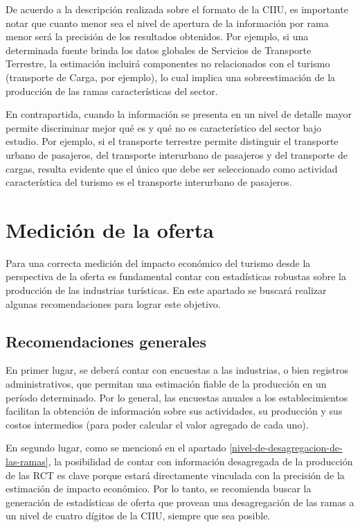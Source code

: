 \documentclass[
  openany]{book}
\begin{document}
De acuerdo a la descripción realizada sobre el formato de la CIIU, es importante notar que cuanto menor sea el nivel de apertura de la información por rama menor será la precisión de los resultados obtenidos. Por ejemplo, si una determinada fuente brinda los datos globales de Servicios de Transporte Terrestre, la estimación incluirá componentes no relacionados con el turismo (transporte de Carga, por ejemplo), lo cual implica una sobreestimación de la producción de las ramas características del sector.

En contrapartida, cuando la información se presenta en un nivel de detalle mayor permite discriminar mejor qué es y qué no es característico del sector bajo estudio. Por ejemplo, si el transporte terrestre permite distinguir el transporte urbano de pasajeros, del transporte interurbano de pasajeros y del transporte de cargas, resulta evidente que el único que debe ser seleccionado como actividad característica del turismo es el transporte interurbano de pasajeros.

\hypertarget{medicion-de-la-oferta}{%
\section{Medición de la oferta}\label{medicion-de-la-oferta}}

Para una correcta medición del impacto económico del turismo desde la perspectiva de la oferta es fundamental contar con estadísticas robustas sobre la producción de las industrias turísticas. En este apartado se buscará realizar algunas recomendaciones para lograr este objetivo.

\hypertarget{recomendaciones-generales}{%
\subsection{Recomendaciones generales}\label{recomendaciones-generales}}

En primer lugar, se deberá contar con encuestas a las industrias, o bien registros administrativos, que permitan una estimación fiable de la producción en un período determinado. Por lo general, las encuestas anuales a los establecimientos facilitan la obtención de información sobre sus actividades, su producción y sus costos intermedios (para poder calcular el valor agregado de cada uno).

En segundo lugar, como se mencionó en el apartado \ref{nivel-de-desagregacion-de-las-ramas}, la posibilidad de contar con información desagregada de la producción de las RCT es clave porque estará directamente vinculada con la precisión de la estimación de impacto económico. Por lo tanto, se recomienda buscar la generación de estadísticas de oferta que provean una desagregación de las ramas a un nivel de cuatro dígitos de la CIIU, siempre que sea posible.
\end{document}
